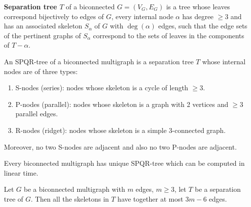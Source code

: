 \begin{defn}
	\textbf{Separation tree $T$} of a biconnected $G = (V_G, E_G)$ is a tree whose leaves correspond bijectively to edges of $G$, every internal node $\alpha$ has degree $\geq 3$ and has an associated skeleton $S_\alpha$ of $G$ with $\deg(\alpha)$ edges, such that the edge sets of the pertinent graphs of $S_\alpha$ correspond to the sets of leaves in the components of $T - \alpha$.
\end{defn}

\begin{defn}
	An SPQR-tree of a biconnected multigraph is a separation tree $T$ whose internal nodes are of three types:
	
	\begin{enumerate}
		\item S-nodes (series): nodes whose skeleton is a cycle of length $\geq 3$.
		\item P-nodes (parallel): nodes whose skeleton is a graph with 2 vertices and $\geq 3$ parallel edges.
		\item R-nodes (ridget): nodes whose skeleton is a simple 3-connected graph.
	\end{enumerate}
	
	\noindent Moreover, no two S-nodes are adjacent and also no two P-nodes are adjacent.
\end{defn}

\begin{fact}
	Every biconnected multigraph has unique SPQR-tree which can be computed in linear time.
\end{fact}

\begin{thm}
	Let $G$ be a biconnected multigraph with $m$ edges, $m \geq 3$, let $T$ be a separation tree of $G$. Then all the skeletons in $T$ have together at most $3m-6$ edges.
\end{thm}


